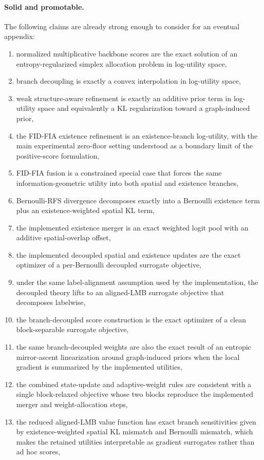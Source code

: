 \paragraph{Solid and promotable.}
The following claims are already strong enough to consider for an eventual appendix:
\begin{enumerate}
\item normalized multiplicative backbone scores are the exact solution of an entropy-regularized simplex allocation problem in log-utility space,
\item branch decoupling is exactly a convex interpolation in log-utility space,
\item weak structure-aware refinement is exactly an additive prior term in log-utility space and equivalently a KL regularization toward a graph-induced prior,
\item the FID-FIA existence refinement is an existence-branch log-utility, with the main experimental zero-floor setting understood as a boundary limit of the positive-score formulation,
\item FID-FIA fusion is a constrained special case that forces the same information-geometric utility into both spatial and existence branches,
\item Bernoulli-RFS divergence decomposes exactly into a Bernoulli existence term plus an existence-weighted spatial KL term,
\item the implemented existence merger is an exact weighted logit pool with an additive spatial-overlap offset,
\item the implemented decoupled spatial and existence updates are the exact optimizer of a per-Bernoulli decoupled surrogate objective,
 \item under the same label-alignment assumption used by the implementation, the decoupled theory lifts to an aligned-LMB surrogate objective that decomposes labelwise,
 \item the branch-decoupled score construction is the exact optimizer of a clean block-separable surrogate objective,
 \item the same branch-decoupled weights are also the exact result of an entropic mirror-ascent linearization around graph-induced priors when the local gradient is summarized by the implemented utilities,
 \item the combined state-update and adaptive-weight rules are consistent with a single block-relaxed objective whose two blocks reproduce the implemented merger and weight-allocation steps,
 \item the reduced aligned-LMB value function has exact branch sensitivities given by existence-weighted spatial KL mismatch and Bernoulli mismatch, which makes the retained utilities interpretable as gradient surrogates rather than ad hoc scores,

\end{enumerate}
